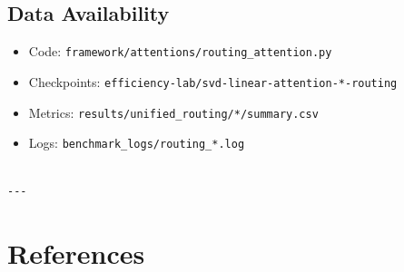 \subsection{Data Availability}

\begin{itemize}
\item Code: \texttt{framework/attentions/routing\_attention.py}
\item Checkpoints: \texttt{efficiency-lab/svd-linear-attention-*-routing}
\item Metrics: \texttt{results/unified\_routing/*/summary.csv}
\item Logs: \texttt{benchmark\_logs/routing\_*.log}
\end{itemize}
\begin{lstlisting}

---
\end{lstlisting}


\section{References}

